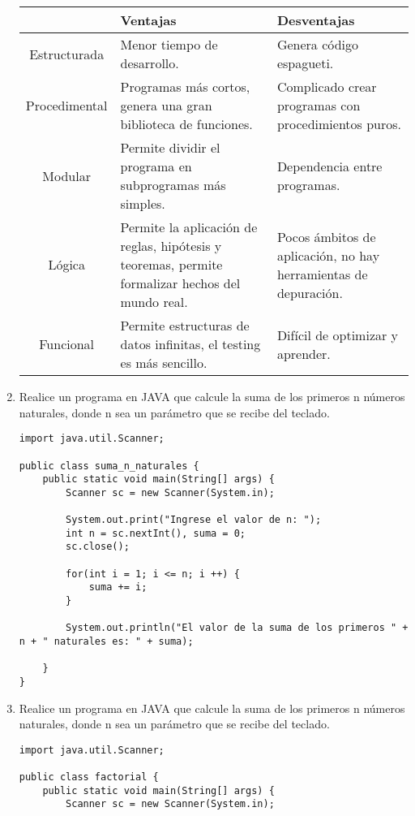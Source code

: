 \documentclass[12pt]{article}
\begin{document}
\begin{enumerate}[leftmargin=*]
        \begin{tabular}{|c|p{5.5cm}|p{5.5cm}|}
            \hline
            ~ & Ventajas & Desventajas \\ \hline
            Estructurada & Menor tiempo de desarrollo. & Genera código espagueti. \\ \hline
            Procedimental & Programas más cortos, genera una gran biblioteca de funciones. & Complicado crear programas con procedimientos puros. \\ \hline
            Modular & Permite dividir el programa en subprogramas más simples. & Dependencia entre programas. \\ \hline
            Lógica & Permite la aplicación de reglas, hipótesis y teoremas, permite formalizar hechos del mundo real. & Pocos ámbitos de aplicación, no hay herramientas de depuración. \\ \hline
            Funcional & Permite estructuras de datos infinitas, el testing es más sencillo. & Difícil de optimizar y aprender. \\ \hline 
        \end{tabular}

        \item Realice un programa en JAVA que calcule la suma de los primeros n números naturales, donde n sea un parámetro que se recibe del teclado. 
        \begin{lstlisting}
import java.util.Scanner;

public class suma_n_naturales {
    public static void main(String[] args) {
        Scanner sc = new Scanner(System.in);

        System.out.print("Ingrese el valor de n: ");
        int n = sc.nextInt(), suma = 0;
        sc.close();

        for(int i = 1; i <= n; i ++) {
            suma += i;
        }

        System.out.println("El valor de la suma de los primeros " + n + " naturales es: " + suma);

    }
}
        \end{lstlisting}

        \item Realice un programa en JAVA que calcule la suma de los primeros n números naturales, donde n sea un parámetro que se recibe del teclado. 
        \begin{lstlisting}
import java.util.Scanner;

public class factorial {
    public static void main(String[] args) {
        Scanner sc = new Scanner(System.in);
    

\end{lstlisting}
\end{enumerate}
\end{document}
